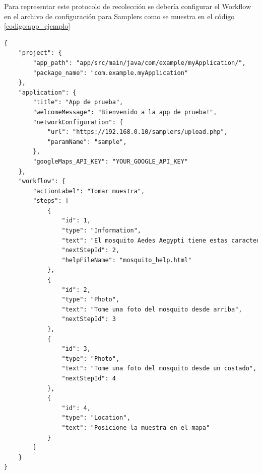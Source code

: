 Para representar este protocolo de recolección se debería configurar el Workflow en el archivo de configuración para Samplers como se muestra en el código \ref{codigo:app_ejemplo} 

\clearpage

\begin{lstlisting}[language=XML, frame=tlbr, label={codigo:app_ejemplo}, caption=Archivo de configuración para Samplers de la app ejemplo.]
{
	"project": {
		"app_path": "app/src/main/java/com/example/myApplication/",
		"package_name": "com.example.myApplication"
	},
	"application": {
		"title": "App de prueba",
		"welcomeMessage": "Bienvenido a la app de prueba!",
		"networkConfiguration": {
			"url": "https://192.168.0.10/samplers/upload.php",
			"paramName": "sample",
		},
		"googleMaps_API_KEY": "YOUR_GOOGLE_API_KEY"
	},
	"workflow": {
		"actionLabel": "Tomar muestra",
		"steps": [
			{
				"id": 1,
				"type": "Information",
				"text": "El mosquito Aedes Aegypti tiene estas características: \n 1) Es negro\n 2) Tiene rayas blancas en cuerpo y patas",
				"nextStepId": 2,
				"helpFileName": "mosquito_help.html"				
			}, 
			{
				"id": 2,
				"type": "Photo",
				"text": "Tome una foto del mosquito desde arriba",
				"nextStepId": 3
			},			
			{
				"id": 3,
				"type": "Photo",
				"text": "Tome una foto del mosquito desde un costado",
				"nextStepId": 4
			},
			{
				"id": 4,
				"type": "Location",
				"text": "Posicione la muestra en el mapa"
			}
		]
	}
}
\end{lstlisting}

